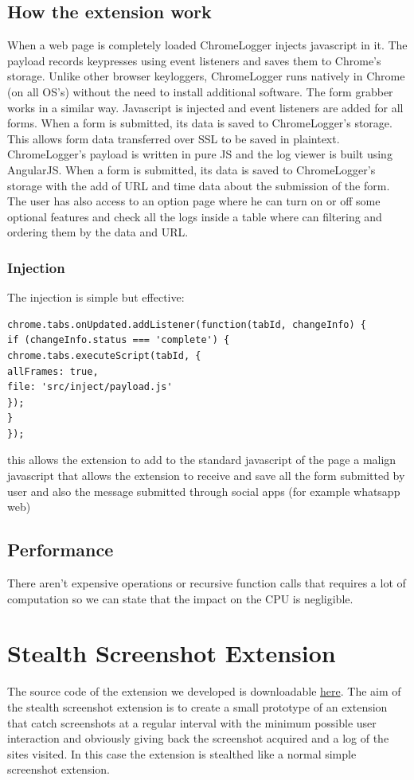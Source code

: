 \documentclass[12pt]{article}
\begin{document}
\begin{multicols}{2}
\subsection*{How the extension work}
When a web page is completely loaded ChromeLogger injects javascript in it. The payload records keypresses using event listeners and saves them to Chrome's storage. Unlike other browser keyloggers, ChromeLogger runs natively in Chrome (on all OS's) without the need to install additional software.
The form grabber works in a similar way. Javascript is injected and event listeners are added for all forms. When a form is submitted, its data is saved to ChromeLogger's storage. This allows form data transferred over SSL to be saved in plaintext.
ChromeLogger's payload is written in pure JS and the log viewer is built using AngularJS. When a form is submitted, its data is saved to ChromeLogger's storage with the add of URL and time data about the submission of the form.
The user has also access to an option page where he can turn on or off some optional features and check all the logs inside a table where can filtering and ordering them by the data and URL.
\subsubsection*{Injection}
The injection is simple but effective:
\begin{lstlisting}
chrome.tabs.onUpdated.addListener(function(tabId, changeInfo) {
if (changeInfo.status === 'complete') {
chrome.tabs.executeScript(tabId, {
allFrames: true, 
file: 'src/inject/payload.js'
});
}
});
\end{lstlisting}
this allows the extension to add to the standard javascript of the page a malign javascript that allows the extension to receive and save all the form submitted by user and also the message submitted through social apps (for example whatsapp web)
\subsection*{Performance}
There aren't expensive operations or recursive function calls that requires a lot of computation so we can state that the impact on the CPU is negligible.
\section*{Stealth Screenshot Extension}
The source code of the extension we developed is downloadable \href{https://github.com/Trexy94/Stealth-screenshot}{here}. The aim of the stealth screenshot extension is to create a small prototype of an extension that catch screenshots at a regular interval with the minimum possible user interaction and obviously giving back the screenshot acquired and a log of the sites visited. In this case the extension is stealthed like a normal simple screenshot extension.

\end{multicols}
\end{document}
